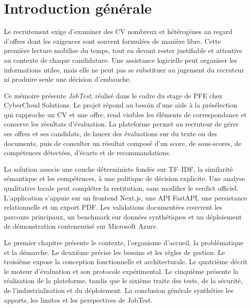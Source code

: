 \chapter*{Introduction générale}

Le recrutement exige d'examiner des CV nombreux et hétérogènes au regard d'offres dont les exigences sont souvent formulées de manière libre. Cette première lecture mobilise du temps, tout en devant rester justifiable et attentive au contexte de chaque candidature. Une assistance logicielle peut organiser les informations utiles, mais elle ne peut pas se substituer au jugement du recruteur ni produire seule une décision d'embauche.

Ce mémoire présente \textit{JobTest}, réalisé dans le cadre du stage de PFE chez CyberCloud Solutions. Le projet répond au besoin d'une aide à la présélection qui rapproche un CV et une offre, rend visibles les éléments de correspondance et conserve les résultats d'évaluation. La plateforme permet au recruteur de gérer ses offres et ses candidats, de lancer des évaluations sur du texte ou des documents, puis de consulter un résultat composé d'un score, de sous-scores, de compétences détectées, d'écarts et de recommandations.

La solution associe une couche déterministe fondée sur TF--IDF, la similarité sémantique et les compétences, à une politique de décision explicite. Une analyse qualitative locale peut compléter la restitution, sans modifier le verdict officiel. L'application s'appuie sur un frontend Next.js, une API FastAPI, une persistance relationnelle et un export PDF. Les validations documentées couvrent les parcours principaux, un benchmark sur données synthétiques et un déploiement de démonstration conteneurisé sur Microsoft Azure.

Le premier chapitre présente le contexte, l'organisme d'accueil, la problématique et la démarche. Le deuxième précise les besoins et les règles de gestion. Le troisième expose la conception fonctionnelle et architecturale. Le quatrième décrit le moteur d'évaluation et son protocole expérimental. Le cinquième présente la réalisation de la plateforme, tandis que le sixième traite des tests, de la sécurité, de l'industrialisation et du déploiement. La conclusion générale synthétise les apports, les limites et les perspectives de JobTest.
